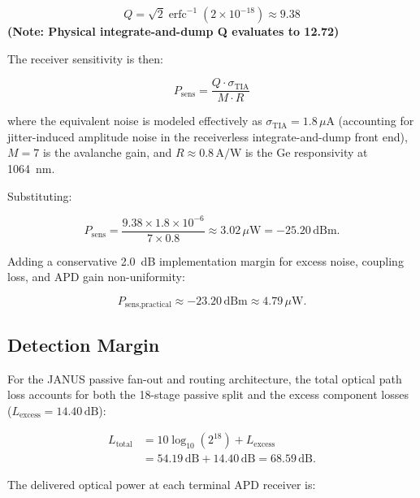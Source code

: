 \documentclass[journal]{IEEEtran}
\begin{document}
\begin{equation}
Q = \sqrt{2} \operatorname{erfc}^{-1}(2 \times 10^{-18}) \approx 9.38
\end{equation}
 \textbf{(Note: Physical integrate-and-dump Q evaluates to 12.72)}

The receiver sensitivity is then:

\begin{equation}
P_{\text{sens}} = \frac{Q \cdot \sigma_{\text{TIA}}}{M \cdot R}
\end{equation}

where the equivalent noise is modeled effectively as $\sigma_{\text{TIA}} = 1.8\,\mu\text{A}$ (accounting for jitter-induced amplitude noise in the receiverless integrate-and-dump front end), $M = 7$ is the avalanche gain, and $R \approx 0.8\,\text{A/W}$ is the Ge responsivity at 1064~nm.

Substituting:

\begin{equation}
P_{\text{sens}} = \frac{9.38 \times 1.8 \times 10^{-6}}{7 \times 0.8} \approx 3.02\,\mu\text{W} = -25.20\,\text{dBm}.
\end{equation}

Adding a conservative 2.0~dB implementation margin for excess noise, coupling loss, and APD gain non-uniformity:

\begin{equation}
P_{\text{sens,practical}} \approx -23.20\,\text{dBm} \approx 4.79\,\mu\text{W}.
\end{equation}

\subsection{\textbf{Detection Margin}}

For the JANUS passive fan-out and routing architecture, the total optical path loss accounts for both the 18-stage passive split and the excess component losses ($L_{\text{excess}} = 14.40\,\text{dB}$):

\begin{equation}
\begin{aligned}
L_{\text{total}} &= 10\log_{10}(2^{18}) + L_{\text{excess}} \\
&= 54.19\,\text{dB} + 14.40\,\text{dB} = 68.59\,\text{dB}.
\end{aligned}
\end{equation}

The delivered optical power at each terminal APD receiver is:
\end{document}
